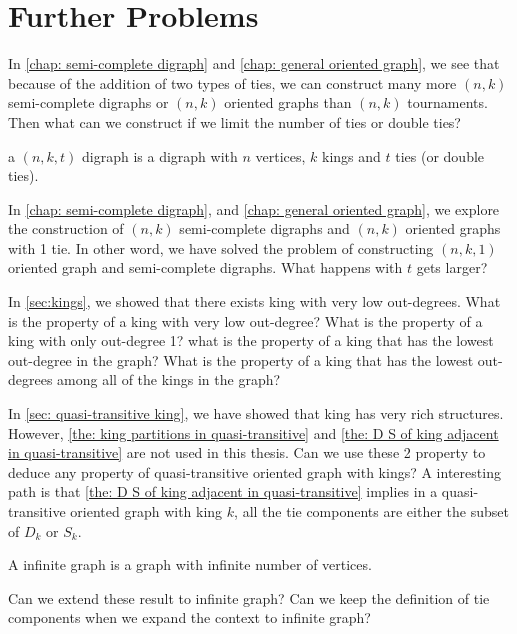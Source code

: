 \chapter{Further Problems}

In \cref{chap: semi-complete digraph} and \cref{chap: general oriented graph},
we see that because of the addition of two types of ties,
we can construct many more \((n, k)\) semi-complete digraphs
or \((n, k)\) oriented graphs than \((n, k)\) tournaments.
Then what can we construct if we limit the number of ties
or double ties?

\begin{definition}
  a \((n, k, t)\) digraph is a digraph with \(n\) vertices,
  \(k\) kings and \(t\) ties (or double ties).
\end{definition}

In \cref{chap: semi-complete digraph}, and \cref{chap: general oriented graph},
we explore the construction of \((n, k)\) semi-complete digraphs
and \((n, k)\) oriented graphs with 1 tie.
In other word, we have solved the problem of constructing
\((n, k, 1)\) oriented graph and semi-complete digraphs.
What happens with \(t\) gets larger?

In \cref{sec:kings}, we showed that there exists king with very
low out-degrees.
What is the property of a king with very low out-degree?
What is the property of a king with only out-degree 1?
what is the property of a king that has the lowest out-degree
in the graph?
What is the property of a king that has the lowest out-degrees
among all of the kings in the graph?

In \cref{sec: quasi-transitive king},
we have showed that king has very rich structures.
However, \cref{the: king partitions in quasi-transitive}
and \cref{the: D S of king adjacent in quasi-transitive}
are not used in this thesis.
Can we use these 2 property to deduce any property
of quasi-transitive oriented graph with kings?
A interesting path is that
\cref{the: D S of king adjacent in quasi-transitive}
implies in a quasi-transitive oriented graph with king \(k\),
all the tie components are either the subset of \(D_k\) or \(S_k\).

\begin{definition}
  A infinite graph is a graph with infinite number of vertices.
\end{definition}

Can we extend these result to infinite graph?
Can we keep the definition of tie components when
we expand the context to infinite graph?

